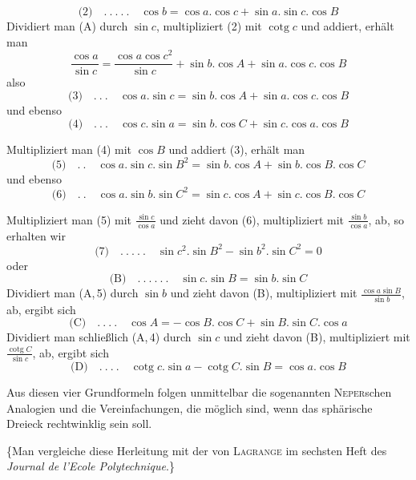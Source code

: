 %
\[
\text{(2)}\quad .\ .\ .\ .\ .\quad\cos b=\cos a.\cos c+\sin a.\sin c.\cos B
\]
Dividiert man (A) durch \(\sin c\), multipliziert (2) mit \(\operatorname{cotg}c\) und addiert, erhält man
\[
\frac{\cos a}{\sin c}=\frac{\cos a\cos c^2}{\sin c}+\sin b.\cos A+\sin a.\cos c.\cos B
\]
also
\[
\text{(3)}\quad .\ .\ .\quad\cos a.\sin c=\sin b.\cos A+\sin a.\cos c.\cos B
\]
und ebenso
\[
\text{(4)}\quad .\ .\ .\quad\cos c.\sin a=\sin b.\cos C+\sin c.\cos a.\cos B
\]
\par
Multipliziert man (4) mit \(\cos B\) und addiert (3), erhält man
\[
\text{(5)}\quad .\ .\quad\cos a.\sin c.\sin B^2=\sin b.\cos A+\sin b.\cos B.\cos C
\]
und ebenso
\[
\text{(6)}\quad .\ .\quad\cos a.\sin b.\sin C^2=\sin c.\cos A+\sin c.\cos B.\cos C
\]
\par
Multipliziert man (5) mit \(\frac{\sin c}{\cos a}\) und zieht davon (6), multipliziert mit \(\frac{\sin b}{\cos a}\), ab, so erhalten wir
\[
\text{(7)}\quad .\ .\ .\ .\ .\quad\sin c^2.\sin B^2-\sin b^2.\sin C^2=0
\]
oder
\[
\text{(B)}\quad .\ .\ .\ .\ .\ .\quad\sin c.\sin B=\sin b.\sin C
\]
Dividiert man (A,\,5) durch \(\sin b\) und zieht davon (B), multipliziert mit \(\frac{\cos a\sin B}{\sin b}\), ab, ergibt sich
\[
\text{(C)}\quad .\ .\ .\ .\quad\cos A=-\cos B.\cos C+\sin B.\sin C.\cos a
\]
Dividiert man schließlich (A,\,4) durch \(\sin c\) und zieht davon (B), multipliziert mit \(\frac{\operatorname{cotg}C}{\sin c}\), ab, ergibt sich
\[
\text{(D)}\quad .\ .\ .\ .\quad\operatorname{cotg}c.\sin a-\operatorname{cotg}C.\sin B=\cos a.\cos B
\]
\par
Aus diesen vier Grundformeln folgen unmittelbar die sogenannten \textsc{Neper}schen Analogien und die Vereinfachungen, die möglich sind, wenn das sphärische Dreieck rechtwinklig sein soll.

\{Man vergleiche diese Herleitung mit der von \textsc{Lagrange} im sechsten Heft des \textit{Journal de l’Ecole Polytechnique}.\}
